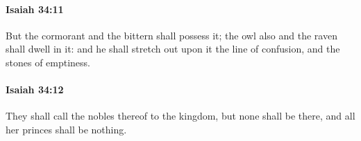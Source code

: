 		\paragraph{Isaiah 34:11} %
			\label{ISAIAH-34-11}

			But the cormorant and the bittern shall possess it; the owl also and the raven shall dwell in it: and he shall stretch out upon it the line of confusion, and the stones of emptiness.


		\paragraph{Isaiah 34:12} %
			\label{ISAIAH-34-12}

			They shall call the nobles thereof to the kingdom, but none shall be there, and all her princes shall be nothing.


